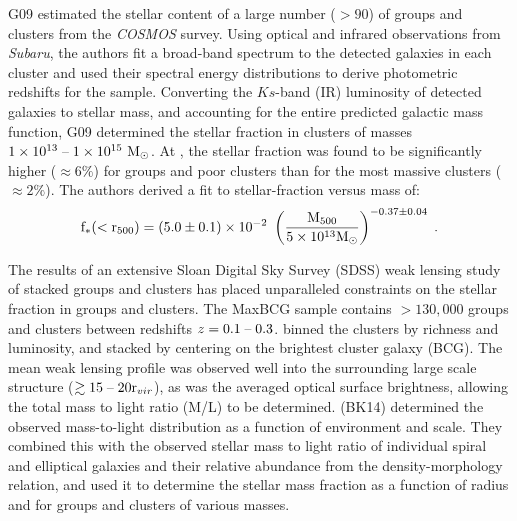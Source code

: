 G09 estimated the stellar content of a large number ($>90$) of
groups and clusters from the \textit{COSMOS} survey. Using optical and
infrared observations from \textit{Subaru}, the authors fit a
broad-band spectrum to the detected galaxies in each cluster and used
their spectral energy distributions to derive photometric redshifts
for the sample. Converting the $Ks$-band (IR) luminosity of detected
galaxies to stellar mass, and accounting for the entire predicted
galactic mass function, G09 determined the stellar fraction in
clusters of masses $1\times 10^{13}\;\textrm{--}\;1\times 10^{15}~\textrm{M}_\odot$. At \rfive{},
the stellar fraction was found to be significantly higher ($\approx
6\%$) for groups and poor clusters than for the most massive clusters
($\approx 2\%$). The authors derived a fit to stellar-fraction versus
mass of:
\begin{equation}
\textrm{f}_{*}(<\textrm{r\ensuremath{_{500}}}{}) =
(5.0\pm0.1)\times 10^{-2}~\left(\frac{\textrm{M\ensuremath{_{500}}}}{5\times 10^{13}\textrm{M}_\odot}\right)^{-0.37\pm0.04}
\;.
\end{equation}

The results of an extensive Sloan Digital Sky Survey (SDSS) weak
lensing study of stacked groups and clusters has placed unparalleled
constraints on the stellar fraction in groups and clusters. The MaxBCG
sample \citep{Sheldon2009a} contains $> 130,000$ groups and clusters
between redshifts $z = 0.1\;\textrm{--}\;0.3$. \citet{Sheldon2009b} binned the
clusters by richness and luminosity, and stacked by centering on the
brightest cluster galaxy (BCG). The mean weak lensing profile was
observed well into the surrounding large scale structure ($\gtrsim
15\;\textrm{--}\;20 \textrm{r\ensuremath{_{vir}}}$), as was the averaged optical surface brightness,
allowing the total mass to light ratio (M/L) to be
determined. \textbf{\citet{Bahcall2014}} (BK14) determined the
observed mass-to-light distribution as a function of environment and
scale. They combined this with the observed stellar mass to light
ratio of individual spiral and elliptical galaxies and their relative
abundance from the density-morphology relation, and used it to
determine the stellar mass fraction as a function of radius and for
groups and clusters of various masses.

